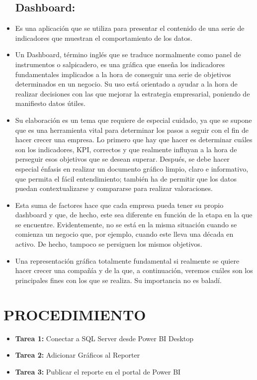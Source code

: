 \documentclass[12pt,letterpaper]{article}
\begin{document}
\begin{itemize}
\subsection{Dashboard:}
	\item Es una aplicación que se utiliza para presentar el
contenido de una serie de indicadores que muestran el comportamiento de los datos. 
\item	Un Dashboard, término inglés que se traduce normalmente como panel de instrumentos o salpicadero, es una gráfica que enseña los indicadores fundamentales implicados a la hora de conseguir una serie de objetivos determinados en un negocio. Su uso está orientado a ayudar a la hora de realizar decisiones con las que mejorar la estrategia empresarial, poniendo de manifiesto datos útiles.
\item	Su elaboración es un tema que requiere de especial cuidado, ya que se supone que es una herramienta vital para determinar los pasos a seguir con el fin de hacer crecer una empresa. Lo primero que hay que hacer es determinar cuáles son los indicadores, KPI, correctos y que realmente influyan a la hora de perseguir esos objetivos que se desean superar. Después, se debe hacer especial énfasis en realizar un documento gráfico limpio, claro e informativo, que permita el fácil entendimiento; también ha de permitir que los datos puedan contextualizarse y compararse para realizar valoraciones.
\item	Esta suma de factores hace que cada empresa pueda tener su propio dashboard y que, de hecho, este sea diferente en función de la etapa en la que se encuentre. Evidentemente, no se está en la misma situación cuando se comienza un negocio que, por ejemplo, cuando este lleva una década en activo. De hecho, tampoco se persiguen los mismos objetivos.
\item	Una representación gráfica totalmente fundamental si realmente se quiere hacer crecer una compañía y de la que, a continuación, veremos cuáles son los principales fines con los que se realiza. Su importancia no es baladí.

\end{itemize}
\section{PROCEDIMIENTO}
\begin{itemize}
	\item \textbf{Tarea 1:} Conectar a SQL Server desde Power BI Desktop 


	\item \textbf{Tarea 2:} Adicionar Gráficos al Reporter


	\item \textbf{Tarea 3:} Publicar el reporte en el portal de Power BI
\end{itemize}
\end{document}
